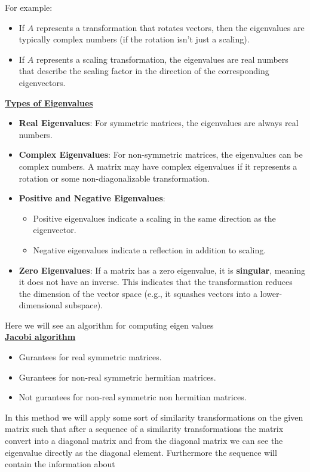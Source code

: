 \documentclass[journal]{IEEEtran}
\begin{document}
For example:
\begin{itemize}
    \item If \( A \) represents a transformation that rotates vectors, then the eigenvalues are typically complex numbers (if the rotation isn't just a scaling).
    \item If \( A \) represents a scaling transformation, the eigenvalues are real numbers that describe the scaling factor in the direction of the corresponding eigenvectors.
\end{itemize}

\underline{\textbf{Types of Eigenvalues}}

\begin{itemize}
    \item \textbf{Real Eigenvalues}: For symmetric matrices, the eigenvalues are always real numbers.
    \item \textbf{Complex Eigenvalues}: For non-symmetric matrices, the eigenvalues can be complex numbers. A matrix may have complex eigenvalues if it represents a rotation or some non-diagonalizable transformation.
    \item \textbf{Positive and Negative Eigenvalues}:
    \begin{itemize}
        \item Positive eigenvalues indicate a scaling in the same direction as the eigenvector.
        \item Negative eigenvalues indicate a reflection in addition to scaling.
    \end{itemize}
    \item \textbf{Zero Eigenvalues}: If a matrix has a zero eigenvalue, it is \textbf{singular}, meaning it does not have an inverse. This indicates that the transformation reduces the dimension of the vector space (e.g., it squashes vectors into a lower-dimensional subspace).
\end{itemize}
Here we will see an algorithm for computing eigen values\\
\underline{\textbf{Jacobi algorithm}}
\begin{itemize}
    \item Gurantees for real symmetric matrices.
    \item Gurantees for non-real symmetric hermitian matrices.
    \item Not gurantees for non-real symmetric non hermitian matrices.
\end{itemize}
In this method we will apply some sort of similarity transformations on the given matrix such that after a sequence of a similarity transformations the matrix convert into a diagonal matrix and from the diagonal matrix we can see the eigenvalue directly as the diagonal element. Furthermore the sequence will contain the information about
\end{document}
